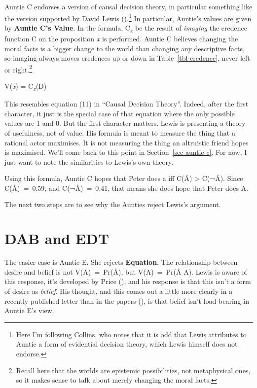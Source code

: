\documentclass[
  11pt,
  letterpaper,
  DIV=11,
  numbers=noendperiod,
  twoside]{scrartcl}
\providecommand{\tightlist}{%
  \setlength{\itemsep}{0pt}\setlength{\parskip}{0pt}}
\begin{document}
Auntie C endorses a version of causal decision theory, in particular
something like the version supported by David Lewis
().\footnote{Here I'm following Collins,
  who notes that it is odd that Lewis attributes to Auntie a form of
  evidential decision theory, which Lewis himself does not endorse.} In
particular, Auntie's values are given by \textbf{Auntie C's Value}. In
the formula, C\textsubscript{\emph{x}} be the result of \emph{imaging}
the credence function C on the proposition \emph{x} is performed. Auntie
C believes changing the moral facts is a bigger change to the world than
changing any descriptive facts, so imaging always moves credences up or
down in Table~\ref{tbl-credence}, never left or right.\footnote{Recall
  here that the worlds are epistemic possibilities, not metaphysical
  ones, so it makes sense to talk about merely changing the moral facts.}

\begin{description}
\tightlist
\item[Auntie C's Value]
V(\emph{x}) = C\textsubscript{\emph{x}}(D)
\end{description}

This resembles equation (11) in ``Causal Decision Theory''. Indeed,
after the first character, it just is the special case of that equation
where the only possible values are 1 and 0. But the first character
matters. Lewis is presenting a theory of usefulness, not of value. His
formula is meant to measure the thing that a rational actor maximises.
It is not measuring the thing an altruistic friend hopes is maximised.
We'll come back to this point in Section~\ref{sec-auntie-c}. For now, I
just want to note the similarities to Lewis's own theory.

Using this formula, Auntie C hopes that Peter does a iff C(Å)
\textgreater{} C(¬Å). Since C(Å)~=~0.59, and C(¬Å)~=~0.41, that means
she does hope that Peter does A.

The next two steps are to see why the Aunties reject Lewis's argument.

\section{DAB and EDT}\label{sec-auntie-e}

The easier case is Auntie E. She rejects \textbf{Equation}. The
relationship between desire and belief is not V(A)~=~Pr(Å), but
V(A)~=~Pr(Å \textbar{} A). Lewis is aware of this response, it's
developed by Price (), and his response is
that this isn't a form of desire as \emph{belief}. His thought, and this
comes out a little more clearly in a recently published letter than in
the papers (), is that belief isn't load-bearing in Auntie E's view.
\end{document}
